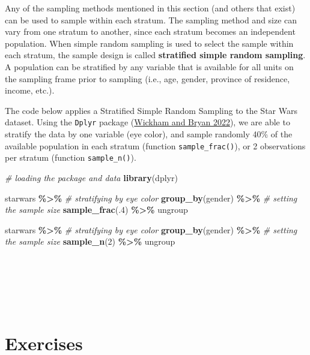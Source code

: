 \documentclass[
]{svmono}
\newenvironment{Shaded}{\begin{snugshade}}{\end{snugshade}}
\newcommand{\CommentTok}[1]{\textcolor[rgb]{0.56,0.35,0.01}{\textit{#1}}}
\newcommand{\DecValTok}[1]{\textcolor[rgb]{0.00,0.00,0.81}{#1}}
\newcommand{\FunctionTok}[1]{\textcolor[rgb]{0.13,0.29,0.53}{\textbf{#1}}}
\newcommand{\NormalTok}[1]{#1}
\newcommand{\SpecialCharTok}[1]{\textcolor[rgb]{0.81,0.36,0.00}{\textbf{#1}}}
\begin{document}
Any of the sampling methods mentioned in this section (and others that
exist) can be used to sample within each stratum. The sampling method
and size can vary from one stratum to another, since each stratum
becomes an independent population. When simple random sampling is used
to select the sample within each stratum, the sample design is called
\textbf{stratified simple random sampling}. A population can be stratified by
any variable that is available for all units on the sampling frame prior
to sampling (i.e., age, gender, province of residence, income, etc.).

The code below applies a Stratified Simple Random Sampling to the Star
Wars dataset. Using the \texttt{Dplyr} package (\protect\hyperlink{ref-wickham2022}{Wickham and Bryan 2022}), we are able to
stratify the data by one variable (eye color), and sample randomly 40\%
of the available population in each stratum (function \texttt{sample\_frac()}),
or 2 observations per stratum (function \texttt{sample\_n()}).

\begin{Shaded}
\begin{Highlighting}[]
\CommentTok{\# loading the package and data}
\FunctionTok{library}\NormalTok{(dplyr)}

\NormalTok{starwars }\SpecialCharTok{\%\textgreater{}\%}
        \CommentTok{\# stratifying by eye color}
        \FunctionTok{group\_by}\NormalTok{(gender) }\SpecialCharTok{\%\textgreater{}\%}
        \CommentTok{\# setting the sample size}
        \FunctionTok{sample\_frac}\NormalTok{(.}\DecValTok{4}\NormalTok{) }\SpecialCharTok{\%\textgreater{}\%}
\NormalTok{        ungroup}

\NormalTok{starwars }\SpecialCharTok{\%\textgreater{}\%}
        \CommentTok{\# stratifying by eye color}
        \FunctionTok{group\_by}\NormalTok{(gender) }\SpecialCharTok{\%\textgreater{}\%}
        \CommentTok{\# setting the sample size}
        \FunctionTok{sample\_n}\NormalTok{(}\DecValTok{2}\NormalTok{) }\SpecialCharTok{\%\textgreater{}\%}
\NormalTok{        ungroup}
\end{Highlighting}
\end{Shaded}

~

~

~

\hypertarget{exercises-2}{%
\section{Exercises}\label{exercises-2}}
\end{document}
